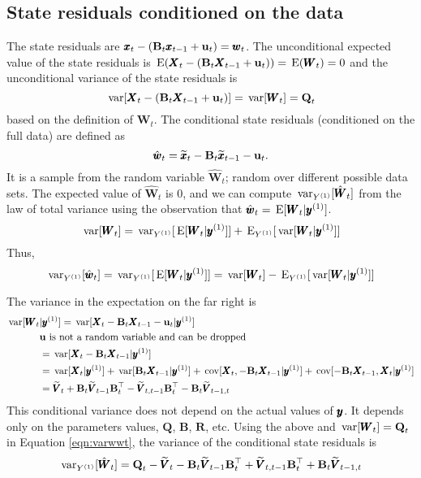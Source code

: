 \documentclass[]{article}
\def\UPS{\mbox{\boldmath $\Upsilon$}}
\def\BB{\mbox{$\mathbf B$}}	\def\bb{\mbox{$\mathbf b$}} \def\Bb{\mbox{$\mathbf J$}} \def\Ba{\mbox{$\mathbf L$}} \def\Bm{\UPS}
\def\E{\,\textup{\textrm{E}}}
\def\QQ{\mbox{$\mathbf Q$}}	 \def\qq{\mbox{$\mathbf q$}} \def\Qb{\mbox{$\mathbf G$}}  \def\Qm{\mathbb{Q}}
\def\RR{\mbox{$\mathbf R$}}	 \def\rr{\mbox{$\mathbf r$}} \def\Rb{\mbox{$\mathbf H$}}	\def\Rm{\mathbb{R}}
\def\VV{\mbox{$\pmb{V}$}}	\def\vv{\mbox{$\pmb{v}$}}
\def\WW{\mbox{$\pmb{W}$}}	\def\ww{\mbox{$\pmb{w}$}}
\def\XX{\mbox{$\pmb{X}$}}	\def\xx{\mbox{$\pmb{x}$}}
\def\var{\,\textup{\textrm{var}}}
\def\cov{\,\textup{\textrm{cov}}}
\def\hatxt{\widetilde{\xx}_t}
\def\hatxtm{\widetilde{\mbox{$\xx$}}_{t-1}}
\def\hatVt{\widetilde{\VV}_t}
\def\hatVtm{\widetilde{\VV}_{t-1}}
\def\hatVttm{\widetilde{\VV}_{t,t-1}}
\begin{document}
\subsection{State residuals conditioned on the data}
The state residuals are $\xx_t - (\BB_t \xx_{t-1} + \uu_t)=\ww_t$.  The unconditional expected value of the state residuals is $\E(\XX_t - (\BB_t \XX_{t-1} + \uu_t)) = \E(\WW_t) = 0$ and the unconditional variance of the state residuals is
\begin{equation}
\var[\XX_t - (\BB_t \XX_{t-1} + \uu_t)] = \var[\WW_t] = \QQ_t
\end{equation}
based on the definition of $\WW_t$.
The conditional state residuals (conditioned on the full data) are defined as
\begin{equation}
\hat{\ww}_t = \hatxt - \BB_t\hatxtm - \uu_t.
\end{equation}
It is a sample from the random variable $\hat{\WW}_t$; random over different possible data sets.  The expected value of $\hat{\WW}_t$ is 0, and we can compute $\var_{Y^{(1)}}[\hat{\WW}_t]$ from the law of total variance using the observation that $\hat{\ww}_t=\E[\WW_t|\yy^{(1)}]$.
\begin{equation}
\var[\WW_t] = \var_{Y^{(1)}}[\E[\WW_t|\yy^{(1)}]] + \E_{Y^{(1)}}[\var[\WW_t|\yy^{(1)}]]
\end{equation}
Thus,
\begin{equation}\label{eqn:var.wtt1}
\var_{Y^{(1)}}[\hat{\ww}_t] = \var_{Y^{(1)}}[\E[\WW_t|\yy^{(1)}]] = \var[\WW_t] - \E_{Y^{(1)}}[\var[\WW_t|\yy^{(1)}]]
\end{equation}

The variance in the expectation on the far right is
\begin{equation}
\begin{split}
\var[\WW_t&|\yy^{(1)}] = \var[ \XX_t - \BB_t\XX_{t-1}-\uu_t | \yy^{(1)} ]\\
&\uu\mbox{ is not a random variable and can be dropped}\\
& = \var[ \XX_t - \BB_t\XX_{t-1} | \yy^{(1)} ] \\
& = \var[ \XX_t | \yy^{(1)} ] + \var[\BB_t\XX_{t-1} | \yy^{(1)} ] + \cov[\XX_t, -\BB_t\XX_{t-1} | \yy^{(1)} ] + \cov[ -\BB_t\XX_{t-1}, \XX_t | \yy^{(1)} ]\\
& = \hatVt + \BB_t \hatVtm \BB_t^\top - \hatVttm \BB_t^\top - \BB_t\widetilde{\VV}_{t-1,t}
\end{split}
\end{equation}
This conditional variance does not depend on the actual values of $\mbox{$\pmb{y}$}$.  It depends only on the parameters values, $\QQ$, $\BB$, $\RR$, etc.
Using the above and $\var[\WW_t]=\QQ_t$ in Equation \ref{eqn:varwwt}, the variance of the conditional state residuals is
\begin{equation}
\var_{Y^{(1)}}[\hat{\WW}_t]  =  \QQ_t - \hatVt - \BB_t \hatVtm \BB_t^\top + \hatVttm \BB_t^\top + \BB_t\widetilde{\VV}_{t-1,t}
\end{equation}
\end{document}
